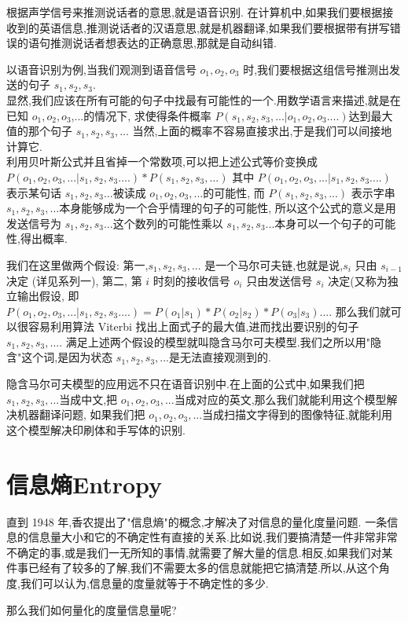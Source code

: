 \documentclass{article}
\begin{document}
根据声学信号来推测说话者的意思,就是语音识别.
在计算机中,如果我们要根据接收到的英语信息,推测说话者的汉语意思,就是机器翻译,如果我们要根据带有拼写错误的语句推测说话者想表达的正确意思,那就是自动纠错.

以语音识别为例,当我们观测到语音信号 $o_1,o_2,o_3$ 时,我们要根据这组信号推测出发送的句子 $s_1,s_2,s_3$.\\
显然,我们应该在所有可能的句子中找最有可能性的一个.用数学语言来描述,就是在已知 $o_1,o_2,o_3$,...的情况下,
求使得条件概率 $P (s_1,s_2,s_3,...|o_1,o_2,o_3....) $达到最大值的那个句子 $s_1,s_2,s_3,...$ 当然,上面的概率不容易直接求出,于是我们可以间接地计算它.\\
利用贝叶斯公式并且省掉一个常数项,可以把上述公式等价变换成 $P(o_1,o_2,o_3,...|s_1,s_2,s_3....) * P(s_1,s_2,s_3,...)$ 
其中 $P(o_1,o_2,o_3,...|s_1,s_2,s_3....)$ 表示某句话 $s_1,s_2,s_3...$被读成 $o_1,o_2,o_3,...$的可能性, 
而 $P(s_1,s_2,s_3,...)$ 表示字串 $s_1,s_2,s_3,...$本身能够成为一个合乎情理的句子的可能性,
所以这个公式的意义是用发送信号为 $s_1,s_2,s_3...$这个数列的可能性乘以 $s_1,s_2,s_3...$本身可以一个句子的可能性,得出概率.

我们在这里做两个假设: 第一,$s_1,s_2,s_3,...$ 是一个马尔可夫链,也就是说,$s_i$ 只由 $s_{i-1}$ 决定 (详见系列一), 第二, 第 $i$ 时刻的接收信号 $o_i$ 只由发送信号 $s_i$ 决定(又称为独立输出假设, 即 $P(o_1,o_2,o_3,...|s_1,s_2,s_3....) = P(o_1|s_1) * P(o_2|s_2)*P(o_3|s_3)....$ 那么我们就可以很容易利用算法 Viterbi 找出上面式子的最大值,进而找出要识别的句子 $s_1,s_2,s_3,....$ 满足上述两个假设的模型就叫隐含马尔可夫模型.我们之所以用"隐含"这个词,是因为状态 $s_1,s_2,s_3,...$是无法直接观测到的.

隐含马尔可夫模型的应用远不只在语音识别中.在上面的公式中,如果我们把 $s_1,s_2,s_3,...$当成中文,把 $o_1,o_2,o_3,...$当成对应的英文,那么我们就能利用这个模型解决机器翻译问题, 如果我们把 $o_1,o_2,o_3,...$当成扫描文字得到的图像特征,就能利用这个模型解决印刷体和手写体的识别.

 \section{信息熵Entropy}
直到 1948 年,香农提出了"信息熵"的概念,才解决了对信息的量化度量问题. 一条信息的信息量大小和它的不确定性有直接的关系.比如说,我们要搞清楚一件非常非常不确定的事,或是我们一无所知的事情,就需要了解大量的信息.相反,如果我们对某件事已经有了较多的了解,我们不需要太多的信息就能把它搞清楚.所以,从这个角度,我们可以认为,信息量的度量就等于不确定性的多少.

那么我们如何量化的度量信息量呢?
\end{document}
